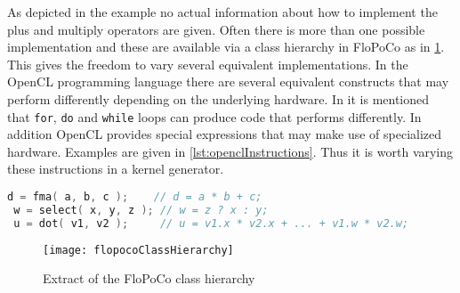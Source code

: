 As depicted in the example no actual information about how to implement the 
plus and multiply operators are given. Often there is more than one possible 
implementation and these are available via a class hierarchy in \ac{FloPoCo} as 
in \cref{fig:flopocoOperators}. This gives the freedom to vary several 
equivalent implementations. In the OpenCL programming language there are 
several equivalent constructs that may perform differently depending on the 
underlying hardware. In \cite[Section 6.8.7.5]{AMD2013} it is mentioned that 
\texttt{for}, \texttt{do} and \texttt{while} loops can produce code that 
performs differently. In addition OpenCL provides special expressions that may 
make use of specialized hardware. Examples are given in 
\cref{lst:openclInstructions}. Thus it is worth varying these instructions in a 
kernel generator.

\begin{lstlisting}[language=OpenCL,caption={Selected OpenCL instructions and 
their semantic},label={lst:openclInstructions}]
 d = fma( a, b, c );    // d = a * b + c;
 w = select( x, y, z ); // w = z ? x : y;
 u = dot( v1, v2 );     // u = v1.x * v2.x + ... + v1.w * v2.w;
\end{lstlisting}


\begin{figure}[htbp]
 \centering
 \texttt{[image: flopocoClassHierarchy]}
 \caption{Extract of the \acs{FloPoCo} class hierarchy}
 \label{fig:flopocoOperators}
\end{figure}


